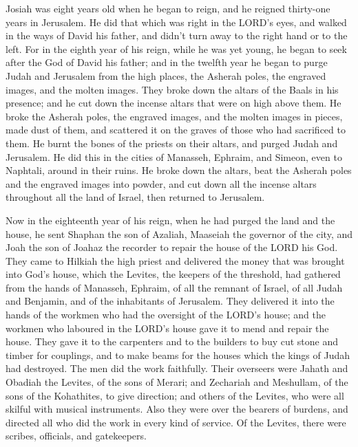  Josiah was eight years old when he began to reign, and he
reigned thirty-one years in Jerusalem.  He did that which
was right in the LORD's eyes, and walked in the ways of David his
father, and didn't turn away to the right hand or to the left.
 For in the eighth year of his reign, while he was yet
young, he began to seek after the God of David his father; and in the
twelfth year he began to purge Judah and Jerusalem from the high places,
the Asherah poles, the engraved images, and the molten images.
 They broke down the altars of the Baals in his presence;
and he cut down the incense altars that were on high above them. He
broke the Asherah poles, the engraved images, and the molten images in
pieces, made dust of them, and scattered it on the graves of those who
had sacrificed to them.  He burnt the bones of the priests
on their altars, and purged Judah and Jerusalem.  He did
this in the cities of Manasseh, Ephraim, and Simeon, even to Naphtali,
around in their ruins.  He broke down the altars, beat the
Asherah poles and the engraved images into powder, and cut down all the
incense altars throughout all the land of Israel, then returned to
Jerusalem.

 Now in the eighteenth year of his reign, when he had
purged the land and the house, he sent Shaphan the son of Azaliah,
Maaseiah the governor of the city, and Joah the son of Joahaz the
recorder to repair the house of the LORD his God.  They
came to Hilkiah the high priest and delivered the money that was brought
into God's house, which the Levites, the keepers of the threshold, had
gathered from the hands of Manasseh, Ephraim, of all the remnant of
Israel, of all Judah and Benjamin, and of the inhabitants of Jerusalem.
 They delivered it into the hands of the workmen who had
the oversight of the LORD's house; and the workmen who laboured in the
LORD's house gave it to mend and repair the house.  They
gave it to the carpenters and to the builders to buy cut stone and
timber for couplings, and to make beams for the houses which the kings
of Judah had destroyed.  The men did the work faithfully.
Their overseers were Jahath and Obadiah the Levites, of the sons of
Merari; and Zechariah and Meshullam, of the sons of the Kohathites, to
give direction; and others of the Levites, who were all skilful with
musical instruments.  Also they were over the bearers of
burdens, and directed all who did the work in every kind of service. Of
the Levites, there were scribes, officials, and gatekeepers.

